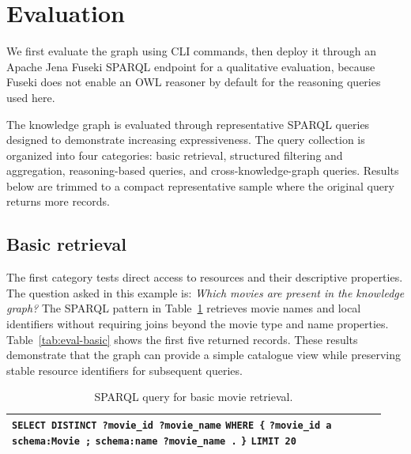\section{Evaluation}\label{sec:eval}

We first evaluate the graph using CLI commands, then deploy it through an
Apache Jena Fuseki SPARQL endpoint for a qualitative evaluation, because
Fuseki does not enable an OWL reasoner by default for the reasoning queries
used here.

The knowledge graph is evaluated through representative SPARQL queries
designed to demonstrate increasing expressiveness. The query collection is
organized into four categories: basic retrieval, structured filtering and
aggregation, reasoning-based queries, and cross-knowledge-graph queries.
Results below are trimmed to a compact representative
sample where the original query returns more records.

\subsection{Basic retrieval}

The first category tests direct access to resources and their descriptive
properties. The question asked in this example is: \emph{Which movies are
present in the knowledge graph?} The SPARQL pattern in
Table~\ref{tab:sparql-basic} retrieves movie names and local identifiers
without requiring joins beyond the movie type and name properties.
Table~\ref{tab:eval-basic} shows the first five returned records. These
results demonstrate that the graph can provide a simple catalogue view while
preserving stable resource identifiers for subsequent queries.

\begin{table}[!htbp]
    \centering
    \caption{SPARQL query for basic movie retrieval.}
    \label{tab:sparql-basic}
    \small
    \begin{tabular}{p{0.94\linewidth}}
        \toprule
        \texttt{SELECT DISTINCT ?movie\_id ?movie\_name} \newline
        \texttt{WHERE \{} \newline
        \texttt{\quad ?movie\_id a schema:Movie ;} \newline
        \texttt{\quad\quad schema:name ?movie\_name .} \newline
        \texttt{\}} \newline
        \texttt{LIMIT 20} \\
        \bottomrule
    \end{tabular}
\end{table}


